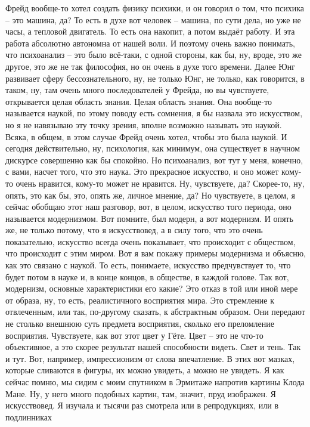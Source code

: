 Фрейд вообще-то хотел создать физику психики, и он говорил о том, что психика –
это машина, да? То есть в духе вот человек – машина, по сути дела, но уже не
часы, а тепловой двигатель. То есть она накопит, а потом выдаёт работу. И эта
работа абсолютно автономна от нашей воли. И поэтому очень важно понимать, что
психоанализ – это было всё-таки, с одной стороны, как бы, ну, вроде, это же
другое, это же не так философия, но он очень в духе того времени. Далее Юнг
развивает сферу бессознательного, ну, не только Юнг, не только, как говорится, в
таком, ну, там очень много последователей у Фрейда, но вы чувствуете,
открывается целая область знания. Целая область знания. Она вообще-то называется
наукой, по этому поводу есть сомнения, я бы назвала это искусством, но я не
навязываю эту точку зрения, вполне возможно называть это наукой. Всяка, в общем,
в этом случае Фрейд очень хотел, чтобы это была наукой. И сегодня действительно,
ну, психология, как минимум, она существует в научном дискурсе совершенно как бы
спокойно. Но психоанализ, вот тут у меня, конечно, с вами, насчет того, что это
наука. Это прекрасное искусство, и оно может кому-то очень нравится, кому-то
может не нравится. Ну, чувствуете, да? Скорее-то, ну, опять, это как бы, это,
опять же, личное мнение, да? Но чувствуете, в целом, я сейчас обобщаю этот наш
разговор, вот, в целом, искусство того периода, оно называется модернизмом. Вот
помните, был модерн, а вот модернизм. И опять же, не только потому, что я
искусствовед, а в силу того, что это очень показательно, искусство всегда очень
показывает, что происходит с обществом, что происходит с этим миром. Вот я вам
покажу примеры модернизма и объясню, как это связано с наукой. То есть,
понимаете, искусство предчувствует то, что будет потом в науке и, в конце
концов, в обществе, в каждой голове. Так вот, модернизм, основные характеристики
его какие? Это отказ в той или иной мере от образа, ну, то есть, реалистичного
восприятия мира. Это стремление к отвлеченным, или так, по-другому сказать, к
абстрактным образом. Они передают не столько внешнюю суть предмета восприятия,
сколько его преломление восприятия. Чувствуете, как вот этот цвет у Гёте. Цвет –
это не что-то объективное, а это скорее результат нашей способности видеть. Свет
и тень. Так и тут. Вот, например, импрессионизм от слова впечатление. В этих вот
мазках, которые сливаются в фигуры, их можно увидеть, а можно не увидеть. Я как
сейчас помню, мы сидим с моим спутником в Эрмитаже напротив картины Клода Мане.
Ну, у него много подобных картин, там, значит, пруд изображен. Я искусствовед. Я
изучала и тысячи раз смотрела или в репродукциях, или в подлинниках
